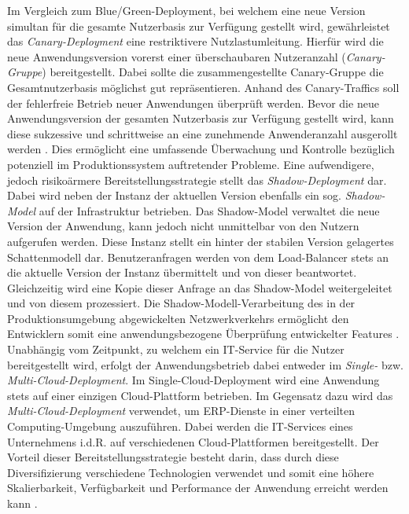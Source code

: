 \vspace*{-15mm}
Im Vergleich zum Blue/Green-Deployment, bei welchem eine neue Version simultan für die gesamte Nutzerbasis zur Verfügung gestellt wird, gewährleistet das \textit{Canary-Deployment} eine restriktivere Nutzlastumleitung. Hierfür wird die neue Anwendungsversion vorerst einer überschaubaren Nutzeranzahl (\textit{Canary-Gruppe}) bereitgestellt. Dabei sollte die zusammengestellte Canary-Gruppe die Gesamtnutzerbasis möglichst gut repräsentieren. Anhand des Canary-Traffics soll der fehlerfreie Betrieb neuer Anwendungen überprüft werden. Bevor die neue Anwendungsversion der gesamten Nutzerbasis zur Verfügung gestellt wird, kann diese sukzessive und schrittweise an eine zunehmende Anwenderanzahl ausgerollt werden \cite{Ugochi.20220503}. Dies ermöglicht eine umfassende Überwachung und Kontrolle bezüglich potenziell im Produktionssystem auftretender Probleme. Eine aufwendigere, jedoch risikoärmere Bereitstellungsstrategie stellt das \textit{Shadow-Deployment} dar. Dabei wird neben der Instanz der aktuellen Version ebenfalls ein sog. \textit{Shadow-Model} auf der Infrastruktur betrieben. Das Shadow-Model verwaltet die neue Version der Anwendung, kann jedoch nicht unmittelbar von den Nutzern aufgerufen werden. Diese Instanz stellt ein hinter der stabilen Version gelagertes Schattenmodell dar. Benutzeranfragen werden von dem Load-Balancer stets an die aktuelle Version der Instanz übermittelt und von dieser beantwortet. Gleichzeitig wird eine Kopie dieser Anfrage an das Shadow-Model weitergeleitet und von diesem prozessiert. Die Shadow-Modell-Verarbeitung des in der Produktionsumgebung abgewickelten Netzwerkverkehrs ermöglicht den Entwicklern somit eine anwendungsbezogene Überprüfung entwickelter Features \cite{Ugochi.20220503}. Unabhängig vom Zeitpunkt, zu welchem ein IT-Service für die Nutzer bereitgestellt 
  wird, erfolgt der Anwendungsbetrieb dabei entweder im \textit{Single-} bzw. \textit{Multi-Cloud-Deployment}. Im Single-Cloud-Deployment wird eine Anwendung stets auf einer einzigen Cloud-Plattform betrieben. Im Gegensatz dazu wird das \textit{Multi-Cloud-Deployment} verwendet, um ERP-Dienste in einer verteilten Computing-Umgebung auszuführen. Dabei werden die IT-Services eines Unternehmens i.d.R. auf verschiedenen Cloud-Plattformen bereitgestellt. Der Vorteil dieser Bereitstellungsstrategie besteht darin, dass durch diese Diversifizierung verschiedene Technologien verwendet und somit eine höhere Skalierbarkeit, Verfügbarkeit und Performance der Anwendung erreicht werden kann \cite{.20230419b}.